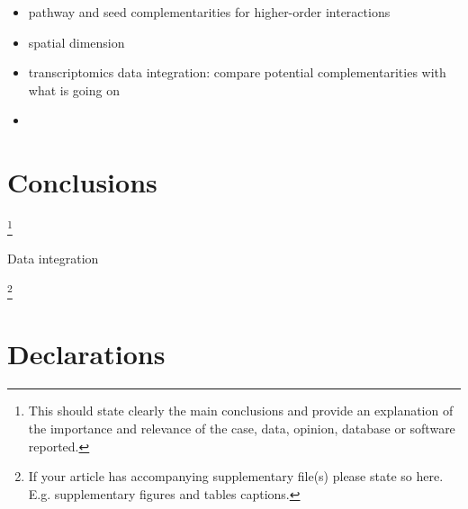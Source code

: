 \documentclass[sn-mathphys,Numbered, lineno]{sn-jnl}  %
\theoremstyle{thmstyleone}%
\theoremstyle{thmstyletwo}%
\theoremstyle{thmstylethree}%
\begin{document}
        \begin{itemize}
            \item pathway and seed complementarities for higher-order interactions 
            \item spatial dimension 
            \item transcriptomics data integration: compare potential complementarities with what is going on 
            \item 
        \end{itemize}




\section*{Conclusions}
\label{sec:conclusions}

    \footnote{
        This should state clearly the main conclusions and provide an explanation of the importance and relevance of the case, data, opinion, database or software reported.
    }

    Data integration 




\backmatter



    \label{supplementary-files}
    \footnote{
        If your article has accompanying supplementary file(s) please state so here.
        E.g. supplementary figures and tables captions. 
    }



\section*{Declarations}
\end{document}
